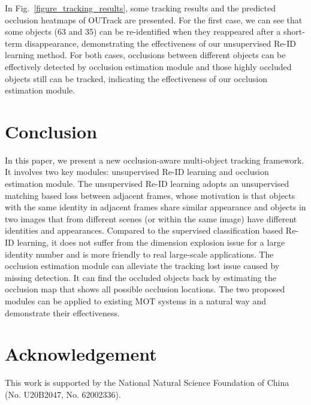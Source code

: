 \documentclass[final,1p,times,twocolumn]{elsarticle}
\newcommand{\fref}[1]{Fig.~\ref{#1}}
\begin{document}
	
	
	In \fref{figure_tracking_results}, some tracking results and the predicted occlusion heatmaps of OUTrack are presented. For the first case, we can see that some objects (63 and 35) can be re-identified when they reappeared after a short-term disappearance, demonstrating the effectiveness of our unsupervised Re-ID learning method. For both cases, occlusions between different objects can be effectively detected by occlusion estimation module and those highly occluded objects still can be tracked, indicating the effectiveness of our occlusion estimation module.
	
	\section{Conclusion}
	\label{section_conclusion}
	In this paper, we present a new occlusion-aware multi-object tracking framework. It involves two key modules: unsupervised Re-ID learning and occlusion estimation module. The unsupervised Re-ID learning adopts an unsupervised matching based loss between adjacent frames, whose motivation is that objects with the same identity in adjacent frames share similar appearance and objects in
	two images that from different scenes (or within the same image) have
	different identities and appearances. Compared to the supervised classification based Re-ID learning, it does not suffer from the dimension explosion issue for a large identity number and is more friendly to real large-scale applications. The occlusion estimation module can alleviate the tracking lost issue caused by missing detection. It can find the occluded objects back by estimating the occlusion map that shows all possible occlusion locations.
	The two proposed modules can be applied to existing MOT systems in a natural way and demonstrate their effectiveness. 
	
	\section{Acknowledgement}
	This  work  is  supported  by  the  National  Natural  Science Foundation  of China (No. U20B2047, No. 62002336).

	 
	
\end{document}
